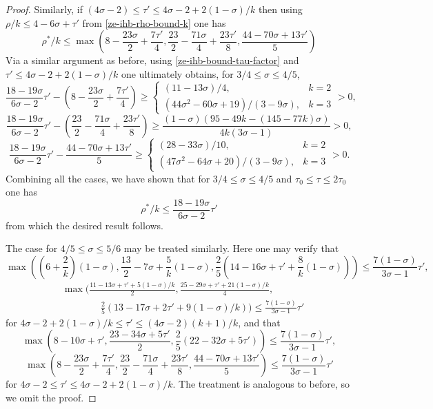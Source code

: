 \begin{proof}
Similarly, if $(4\sigma - 2) \le \tau' \le 4\sigma - 2 + 2(1 - \sigma)/k$ then using $\rho/k \le 4 - 6\sigma + \tau'$ from \eqref{ze-ihb-rho-bound-k} one has
\[
\rho^*/k \le \max(8 - \frac{23\sigma}{2} + \frac{7\tau'}{4}, \frac{23}{2} - \frac{71\sigma}{4} + \frac{23\tau'}{8}, \frac{44 - 70\sigma + 13\tau'}{5})
\]
Via a similar argument as before, using \eqref{ze-ihb-bound-tau-factor} and $\tau' \le 4\sigma - 2 + 2(1 - \sigma)/k$ one ultimately obtains, for $3/4 \le \sigma \le 4/5$,
\[
\frac{18 - 19\sigma}{6\sigma - 2}\tau' - (8 - \frac{23\sigma}{2} + \frac{7\tau'}{4}) \ge \begin{cases}
(11 - 13 \sigma)/4,&k = 2\\
(44\sigma^2 - 60\sigma + 19)/(3 - 9\sigma),&k = 3
\end{cases} > 0,
\]
\[
\frac{18 - 19\sigma}{6\sigma - 2}\tau' - (\frac{23}{2} - \frac{71\sigma}{4} + \frac{23\tau'}{8}) \ge \frac{(1 - \sigma) (95 - 49 k - (145 - 77 k)\sigma)}{4 k (3\sigma - 1)} > 0,
\]
\[
\frac{18 - 19\sigma}{6\sigma - 2}\tau' - \frac{44 - 70\sigma + 13\tau'}{5} \ge \begin{cases}
(28 - 33\sigma)/10,&k = 2\\
(47\sigma^2 - 64\sigma + 20)/(3 - 9\sigma),&k=3
\end{cases} > 0.
\]
Combining all the cases, we have shown that for $3/4 \le \sigma \le 4/5$ and $\tau_0 \le \tau \le 2\tau_0$ one has
\[
\rho^*/k \le \frac{18 - 19\sigma}{6\sigma - 2}\tau'
\]
from which the desired result follows.

The case for $4/5 \le \sigma \le 5/6$ may be treated similarly. Here one may verify that
\[
\max((6 + \frac{2}{k})(1 - \sigma), \frac{13}{2} - 7\sigma + \frac{5}{k} (1 - \sigma), \frac{2}{5}(14 - 16\sigma + \tau' + \frac{8}{k}(1 - \sigma))) \le \frac{7(1 - \sigma)}{3\sigma - 1}\tau',
\]
\begin{align*}
&\max(\frac{11 - 13\sigma + \tau' + 5(1 - \sigma)/k}{2}, \frac{25 - 29\sigma + \tau' + 21(1-\sigma)/k}{4},\\
&\qquad\qquad\frac{2}{5}(13 - 17 \sigma + 2\tau' + 9 (1 - \sigma)/k)) \le \frac{7(1 - \sigma)}{3\sigma - 1}\tau'
\end{align*}
for $4\sigma - 2 + 2(1 - \sigma)/k \le \tau' \le (4\sigma - 2)(k + 1)/k$, and that
\[
\max(8 -10\sigma + \tau',\frac{23 - 34\sigma + 5\tau'}{2}, \frac{2}{5}(22 - 32\sigma +  5\tau')) \le \frac{7(1 - \sigma)}{3\sigma - 1}\tau',
\]
\[
\max(8 - \frac{23\sigma}{2} + \frac{7\tau'}{4}, \frac{23}{2} - \frac{71\sigma}{4} + \frac{23\tau'}{8}, \frac{44 - 70\sigma + 13\tau'}{5}) \le \frac{7(1 - \sigma)}{3\sigma - 1}\tau'
\]
for $4\sigma - 2 \le \tau' \le 4\sigma - 2 + 2(1 - \sigma)/k$. The treatment is analogous to before, so we omit the proof.
\end{proof}

